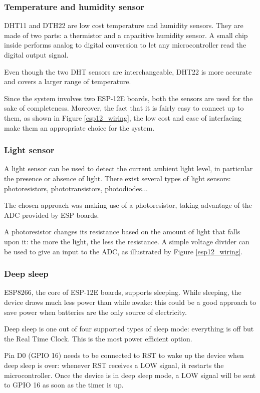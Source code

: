 \subsubsection{Temperature and humidity sensor}
DHT11 and DTH22 are low cost temperature and humidity sensors. They are made of two parts: a thermistor and a capacitive humidity sensor. A small chip inside performs analog to digital conversion to let any microcontroller read the digital output signal.

Even though the two DHT sensors are interchangeable, DHT22 is more accurate and covers a larger range of temperature.

Since the system involves two ESP-12E boards, both the sensors are used for the sake of completeness. Moreover, the fact that it is fairly easy to connect up to them, as shown in Figure \ref{esp12_wiring}, the low cost and ease of interfacing make them an appropriate choice for the system.

\subsubsection{Light sensor}
A light sensor can be used to detect the current ambient light level, in particular the presence or absence of light. There exist several types of light sensors: photoresistors, phototransistors, photodiodes...

The chosen approach was making use of a photoresistor, taking advantage of the ADC provided by ESP boards.

A photoresistor changes its resistance based on the amount of light that falls upon it: the more the light, the less the resistance. A simple voltage divider can be used to give an input to the ADC, as illustrated by Figure \ref{esp12_wiring}.

\subsubsection{Deep sleep}
ESP8266, the core of ESP-12E boards, supports sleeping. While sleeping, the device draws much less power than while awake: this could be a good approach to save power when batteries are the only source of electricity.

Deep sleep is one out of four supported types of sleep mode: everything is off but the Real Time Clock. This is the most power efficient option.

Pin D0 (GPIO 16) needs to be connected to RST to wake up the device when deep sleep is over: whenever RST receives a LOW signal, it restarts the microcontroller. Once the device is in deep sleep mode, a LOW signal will be sent to GPIO 16 as soon as the timer is up.

